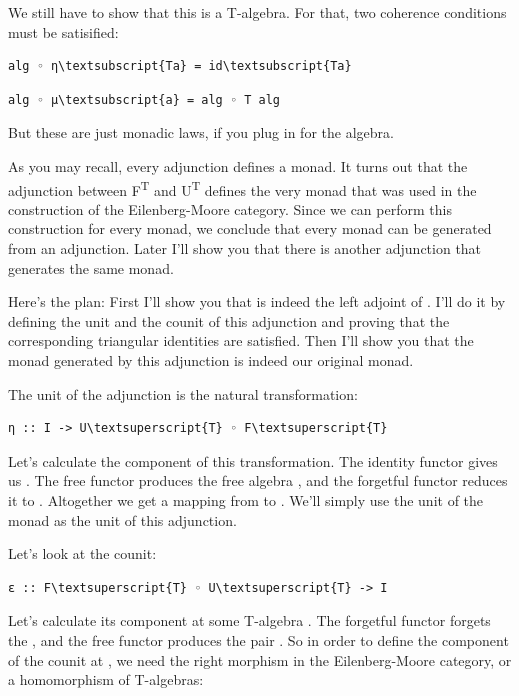 We still have to show that this is a T-algebra. For that, two coherence
conditions must be satisified:

\begin{Verbatim}[commandchars=\\\{\}]
alg ◦ η\textsubscript{Ta} = id\textsubscript{Ta}
\end{Verbatim}
\begin{Verbatim}[commandchars=\\\{\}]
alg ◦ μ\textsubscript{a} = alg ◦ T alg
\end{Verbatim}
But these are just monadic laws, if you plug in  for the
algebra.

As you may recall, every adjunction defines a monad. It turns out that
the adjunction between F\textsuperscript{T} and U\textsuperscript{T}
defines the very monad  that was used in the construction of
the Eilenberg-Moore category. Since we can perform this construction for
every monad, we conclude that every monad can be generated from an
adjunction. Later I'll show you that there is another adjunction that
generates the same monad.

Here's the plan: First I'll show you that  is indeed the left
adjoint of . I'll do it by defining the unit and the counit
of this adjunction and proving that the corresponding triangular
identities are satisfied. Then I'll show you that the monad generated by
this adjunction is indeed our original monad.

The unit of the adjunction is the natural transformation:

\begin{Verbatim}[commandchars=\\\{\}]
η :: I -> U\textsuperscript{T} ◦ F\textsuperscript{T}
\end{Verbatim}
Let's calculate the  component of this transformation. The
identity functor gives us . The free functor produces the free
algebra , and the forgetful functor reduces it to
. Altogether we get a mapping from  to
. We'll simply use the unit of the monad  as the
unit of this adjunction.

Let's look at the counit:

\begin{Verbatim}[commandchars=\\\{\}]
ε :: F\textsuperscript{T} ◦ U\textsuperscript{T} -> I
\end{Verbatim}
Let's calculate its component at some T-algebra . The
forgetful functor forgets the , and the free functor produces
the pair . So in order to define the component of
the counit  at , we need the right morphism in
the Eilenberg-Moore category, or a homomorphism of T-algebras:

